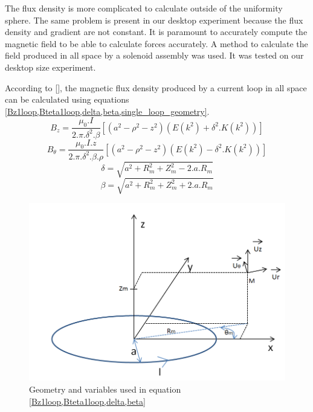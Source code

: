 \documentclass[letterpaper, 10 pt, conference]{ieeeconf}  %
\begin{document}
The flux density is more complicated to calculate outside of the uniformity sphere. The same problem is present in our desktop experiment because the flux density and gradient are not constant. It is paramount to accurately compute the magnetic field to be able to calculate forces accurately. A method to calculate the field produced in all space by a solenoid assembly was used. It was tested on our desktop size experiment.\par
According to [], the magnetic flux density produced by a current loop in all space can be calculated using equations \cref{Bz1loop,Bteta1loop,delta,beta,single_loop_geometry}.
\begin{equation}
B_z=\frac{\mu _0.I}{2.\pi.\delta ^{2}.\beta  }\left [ \left ( a^2-\rho ^2-z^2 \right )(E(k^2)+\delta ^2.K(k^2)) \right ] 
\label{Bz1loop}
\end{equation}
\begin{equation}
B_\theta=\frac{\mu _0.I.z}{2.\pi.\delta ^{2}.\beta.\rho   }\left [ \left ( a^2-\rho ^2-z^2 \right )(E(k^2)-\delta ^2.K(k^2)) \right ]
\label{Bteta1loop}
\end{equation}
\begin{equation}
\delta =\sqrt{a^2+R_m^2+Z_m^2-2.a.R_m}
\label{delta}
\end{equation}
\begin{equation}
\beta =\sqrt{a^2+R_m^2+Z_m^2+2.a.R_m}
\label{beta}
\end{equation}

\begin{figure}
  \includegraphics[width=\linewidth]{single_loop.png}
  \caption{Geometry and variables used in equation \cref{Bz1loop,Bteta1loop,delta,beta}}
  \label{single_loop_geometry}
\end{figure}
\end{document}
